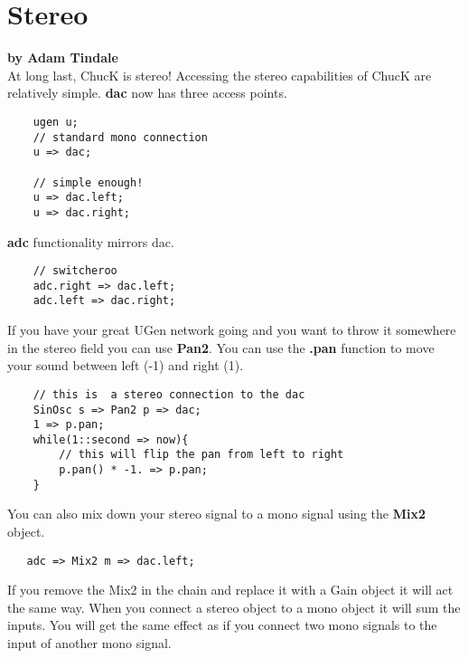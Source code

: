 \section{Stereo}
\textbf{by Adam Tindale}\\

At long last, ChucK is stereo! Accessing the stereo capabilities of ChucK are relatively simple. {\bf dac} now has three access points. 

\begin{verbatim}
    ugen u;
    // standard mono connection
    u => dac;

    // simple enough!
    u => dac.left;
    u => dac.right;
\end{verbatim}

{\bf adc} functionality mirrors dac. 

\begin{verbatim}
    // switcheroo
    adc.right => dac.left;
    adc.left => dac.right;
\end{verbatim}

If you have your great UGen network going and you want to throw it somewhere in the stereo field you can use {\bf Pan2}. You can use the {\bf .pan} function to move your sound between left (-1) and right (1).

\begin{verbatim}
    // this is  a stereo connection to the dac
    SinOsc s => Pan2 p => dac;
    1 => p.pan;
    while(1::second => now){
        // this will flip the pan from left to right
        p.pan() * -1. => p.pan;
    }
\end{verbatim}


You can also mix down your stereo signal to a mono signal using the {\bf Mix2} object. 

\begin{verbatim}
   adc => Mix2 m => dac.left;
\end{verbatim}

If you remove the Mix2 in the chain and replace it with a Gain object it will act the same way. When you connect a stereo object to a mono object it will sum the inputs. You will get the same effect as if you connect two mono signals to the input of another mono signal. 